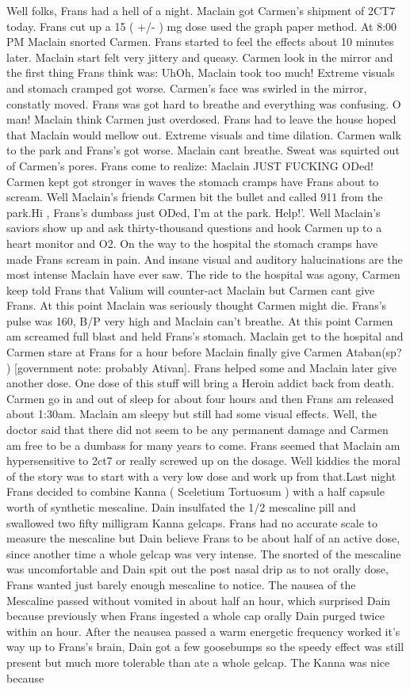 \documentclass[12pt]{book}
\begin{document}
Well folks, Frans had a hell of a night. Maclain got Carmen's shipment of 2CT7 today. Frans cut up a 15 ( +/- ) mg dose used the graph paper method. At 8:00 PM Maclain snorted Carmen. Frans started to feel the effects about 10 minutes later. Maclain start felt very jittery and queasy. Carmen look in the mirror and the first thing Frans think was: UhOh, Maclain took too much! Extreme visuals and stomach cramped got worse. Carmen's face was swirled in the mirror, constatly moved. Frans was got hard to breathe and everything was confusing. O man! Maclain think Carmen just overdosed. Frans had to leave the house hoped that Maclain would mellow out. Extreme visuals and time dilation. Carmen walk to the park and Frans's got worse. Maclain cant breathe. Sweat was squirted out of Carmen's pores. Frans come to realize: Maclain JUST FUCKING ODed! Carmen kept got stronger in waves the stomach cramps have Frans about to scream. Well Maclain's friends Carmen bit the bullet and called 911 from the park.Hi , Frans's dumbass just ODed, I'm at the park. Help!'. Well Maclain's saviors show up and ask thirty-thousand questions and hook Carmen up to a heart monitor and O2. On the way to the hospital the stomach cramps have made Frans scream in pain. And insane visual and auditory halucinations are the most intense Maclain have ever saw. The ride to the hospital was agony, Carmen keep told Frans that Valium will counter-act Maclain but Carmen cant give Frans. At this point Maclain was seriously thought Carmen might die. Frans's pulse was 160, B/P very high and Maclain can't breathe. At this point Carmen am screamed full blast and held Frans's stomach. Maclain get to the hospital and Carmen stare at Frans for a hour before Maclain finally give Carmen Ataban(sp? ) [government note: probably Ativan]. Frans helped some and Maclain later give another dose. One dose of this stuff will bring a Heroin addict back from death. Carmen go in and out of sleep for about four hours and then Frans am released about 1:30am. Maclain am sleepy but still had some visual effects. Well, the doctor said that there did not seem to be any permanent damage and Carmen am free to be a dumbass for many years to come. Frans seemed that Maclain am hypersensitive to 2ct7 or really screwed up on the dosage. Well kiddies the moral of the story was to start with a very low dose and work up from that.Last night Frans decided to combine Kanna ( Sceletium Tortuosum ) with a half capsule worth of synthetic mescaline. Dain insulfated the 1/2 mescaline pill and swallowed two fifty milligram Kanna gelcaps. Frans had no accurate scale to measure the mescaline but Dain believe Frans to be about half of an active dose, since another time a whole gelcap was very intense. The snorted of the mescaline was uncomfortable and Dain spit out the post nasal drip as to not orally dose, Frans wanted just barely enough mescaline to notice. The nausea of the Mescaline passed without vomited in about half an hour, which surprised Dain because previously when Frans ingested a whole cap orally Dain purged twice within an hour. After the neausea passed a warm energetic frequency worked it's way up to Frans's brain, Dain got a few goosebumps so the speedy effect was still present but much more tolerable than ate a whole gelcap. The Kanna was nice because 
\end{document}
